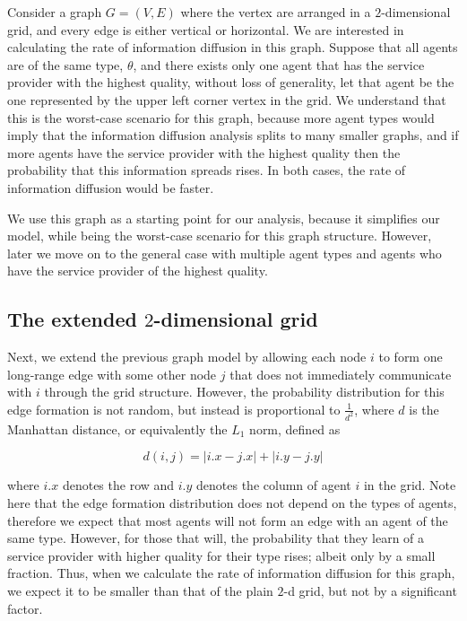 \documentclass[A4paper,11pt]{article}
\begin{document}
\par Consider a graph $G = (V, E)$ where the vertex are arranged in a $2$-dimensional grid, and every edge is either vertical
or horizontal. We are interested in calculating the rate of information diffusion in this graph. Suppose that all agents are of
the same type, $\theta$, and there exists only one agent that has the service provider with the highest quality, without loss of
generality, let that agent be the one represented by the upper left corner vertex in the grid. We understand that this is the
worst-case scenario for this graph, because more agent types would imply that the information diffusion analysis splits to many
smaller graphs, and if more agents have the service provider with the highest quality then the probability that this information
spreads rises. In both cases, the rate of information diffusion would be faster.

\par We use this graph as a starting point for our analysis, because it simplifies our model, while being the worst-case scenario
for this graph structure. However, later we move on to the general case with multiple agent types and agents who have the
service provider of the highest quality.

\subsection{The extended $2$-dimensional grid}

\par Next, we extend the previous graph model by allowing each node $i$ to form one long-range edge with some other node $j$ that
does not immediately communicate with $i$ through the grid structure. However, the probability distribution for this edge
formation is not random, but instead is proportional to $\frac{1}{d^2}$, where $d$ is the Manhattan distance, or equivalently
the $L_1$ norm, defined as

\[
d(i, j) = |i.x - j.x| + |i.y - j.y|
\]

where $i.x$ denotes the row and $i.y$ denotes the column of agent $i$ in the grid. Note here that the edge formation
distribution does not depend on the types of agents, therefore we expect that most agents will not form an edge with
an agent of the same type. However, for those that will, the probability that they learn of a service provider with higher
quality for their type rises; albeit only by a small fraction. Thus, when we calculate the rate of information diffusion for
this graph, we expect it to be smaller than that of the plain $2$-d grid, but not by a significant factor.
\end{document}
